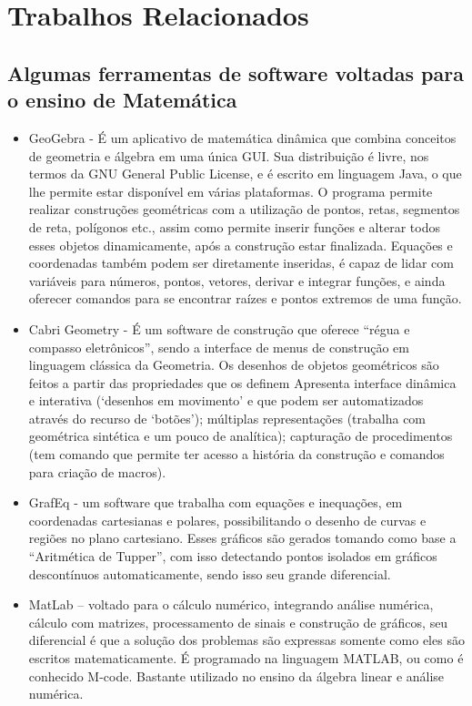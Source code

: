 \documentclass[12pt,a4paper]{article}
\begin{document}
\section{Trabalhos Relacionados}
\subsection{Algumas ferramentas de software voltadas para o ensino de Matemática} 
\begin{itemize}
\item GeoGebra - É um aplicativo de matemática dinâmica que combina conceitos de geometria e álgebra em uma única GUI. Sua distribuição é livre, nos termos da GNU General Public License, e é escrito em linguagem Java, o que lhe permite estar disponível em várias plataformas. O programa permite realizar construções geométricas com a utilização de pontos, retas, segmentos de reta, polígonos etc., assim como permite inserir funções e alterar todos esses objetos dinamicamente, após a construção estar finalizada. Equações e coordenadas também podem ser diretamente inseridas, é capaz de lidar com variáveis para números, pontos, vetores, derivar e integrar funções, e ainda oferecer comandos para se encontrar raízes e pontos extremos de uma função.

\item Cabri Geometry - É um software de construção que oferece “régua e compasso eletrônicos”, sendo a interface de menus de construção em linguagem clássica da Geometria. Os desenhos de objetos geométricos são feitos a partir das propriedades que os definem Apresenta interface dinâmica e interativa (‘desenhos em movimento’ e que podem ser automatizados através do recurso de ‘botões’); múltiplas representações (trabalha com geométrica sintética e um pouco de analítica); capturação de procedimentos (tem comando que permite ter acesso a história da construção e comandos para criação de macros).

\item GrafEq - um software que trabalha com equações e inequações, em coordenadas cartesianas e polares, possibilitando o desenho de curvas e regiões no plano cartesiano. Esses gráficos são gerados tomando como base a “Aritmética de Tupper”, com isso detectando pontos isolados em gráficos descontínuos automaticamente, sendo isso seu grande diferencial.

\item MatLab – voltado para o cálculo numérico, integrando análise numérica, cálculo com matrizes, processamento de sinais e construção de gráficos, seu diferencial é que a solução dos problemas são expressas somente como eles são escritos matematicamente. É programado na linguagem MATLAB, ou como é conhecido M-code. Bastante utilizado no ensino da álgebra linear e análise numérica.


\end{itemize}
\end{document}

